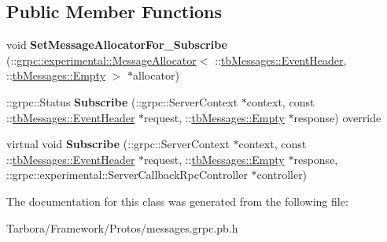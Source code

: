 \subsection*{Public Member Functions}
\begin{DoxyCompactItemize}
\item 
\mbox{\label{classtbMessages_1_1TarboraMessages_1_1ExperimentalWithCallbackMethod__Subscribe_a55441070d9aaeb952650c61e71cfaf41}} 
void {\bfseries Set\+Message\+Allocator\+For\+\_\+\+Subscribe} (\+::\hyperlink{classgrpc_1_1experimental_1_1MessageAllocator}{grpc\+::experimental\+::\+Message\+Allocator}$<$ \+::\hyperlink{classtbMessages_1_1EventHeader}{tb\+Messages\+::\+Event\+Header}, \+::\hyperlink{classtbMessages_1_1Empty}{tb\+Messages\+::\+Empty} $>$ $\ast$allocator)
\item 
\mbox{\label{classtbMessages_1_1TarboraMessages_1_1ExperimentalWithCallbackMethod__Subscribe_a7a764dfac6086ebc152145fb790e6cdb}} 
\+::grpc\+::\+Status {\bfseries Subscribe} (\+::grpc\+::\+Server\+Context $\ast$context, const \+::\hyperlink{classtbMessages_1_1EventHeader}{tb\+Messages\+::\+Event\+Header} $\ast$request, \+::\hyperlink{classtbMessages_1_1Empty}{tb\+Messages\+::\+Empty} $\ast$response) override
\item 
\mbox{\label{classtbMessages_1_1TarboraMessages_1_1ExperimentalWithCallbackMethod__Subscribe_a86d51001bd5a50bd2312613980994617}} 
virtual void {\bfseries Subscribe} (\+::grpc\+::\+Server\+Context $\ast$context, const \+::\hyperlink{classtbMessages_1_1EventHeader}{tb\+Messages\+::\+Event\+Header} $\ast$request, \+::\hyperlink{classtbMessages_1_1Empty}{tb\+Messages\+::\+Empty} $\ast$response, \+::grpc\+::experimental\+::\+Server\+Callback\+Rpc\+Controller $\ast$controller)
\end{DoxyCompactItemize}


The documentation for this class was generated from the following file\+:\begin{DoxyCompactItemize}
\item 
Tarbora/\+Framework/\+Protos/messages.\+grpc.\+pb.\+h\end{DoxyCompactItemize}

